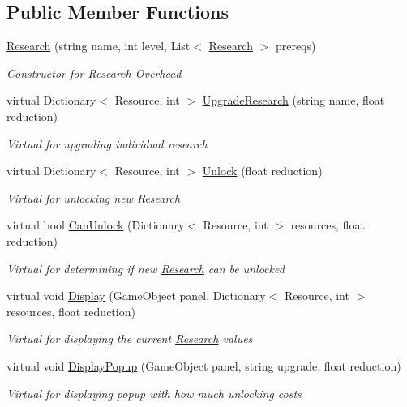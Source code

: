 \subsection*{Public Member Functions}
\begin{DoxyCompactItemize}
\item 
\hyperlink{class_research_a1e63a15415de84a82fb91005c214f289}{Research} (string name, int level, List$<$ \hyperlink{class_research}{Research} $>$ prereqs)
\begin{DoxyCompactList}\small\item\em Constructor for \hyperlink{class_research}{Research} Overhead \end{DoxyCompactList}\item 
virtual Dictionary$<$ Resource, int $>$ \hyperlink{class_research_a963cb6ac5e27b234a3da2b1be640bc6a}{Upgrade\+Research} (string name, float reduction)
\begin{DoxyCompactList}\small\item\em Virtual for upgrading individual research \end{DoxyCompactList}\item 
virtual Dictionary$<$ Resource, int $>$ \hyperlink{class_research_a5ae3ebe38d15f37ce6cc61fa8a76c6fc}{Unlock} (float reduction)
\begin{DoxyCompactList}\small\item\em Virtual for unlocking new \hyperlink{class_research}{Research} \end{DoxyCompactList}\item 
virtual bool \hyperlink{class_research_a0dd2f3c56699958f10865537bd61a8d0}{Can\+Unlock} (Dictionary$<$ Resource, int $>$ resources, float reduction)
\begin{DoxyCompactList}\small\item\em Virtual for determining if new \hyperlink{class_research}{Research} can be unlocked \end{DoxyCompactList}\item 
virtual void \hyperlink{class_research_aa47288e846f7992eaf88e29c2c790dc0}{Display} (Game\+Object panel, Dictionary$<$ Resource, int $>$ resources, float reduction)
\begin{DoxyCompactList}\small\item\em Virtual for displaying the current \hyperlink{class_research}{Research} values \end{DoxyCompactList}\item 
virtual void \hyperlink{class_research_a3c61c95bc273b0effe02577c7e5d29f5}{Display\+Popup} (Game\+Object panel, string upgrade, float reduction)
\begin{DoxyCompactList}\small\item\em Virtual for displaying popup with how much unlocking costs \end{DoxyCompactList}\end{DoxyCompactItemize}
